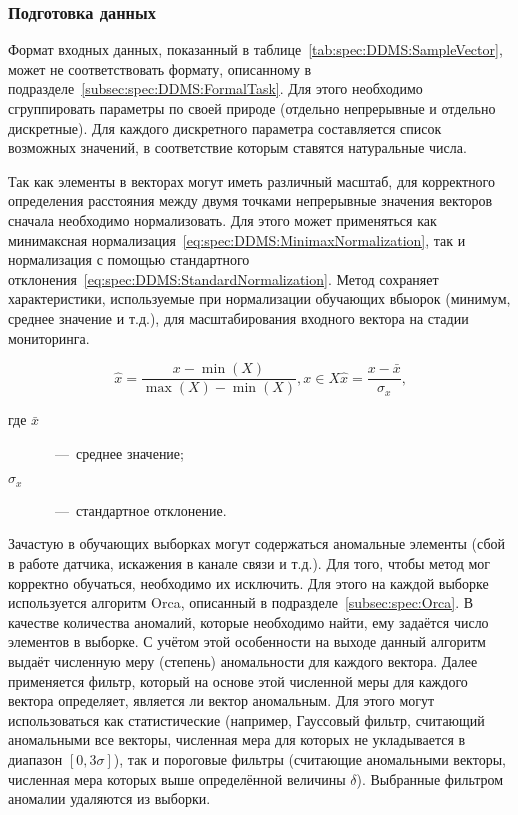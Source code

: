 \subsubsection{Подготовка данных}
\label{subsubsec:spec:DDMS:Preparing}
Формат входных данных, показанный в таблице~\ref{tab:spec:DDMS:SampleVector}, может не соответствовать формату, описанному в подразделе~\ref{subsec:spec:DDMS:FormalTask}. Для этого необходимо сгруппировать параметры по своей природе (отдельно непрерывные и отдельно дискретные). Для каждого дискретного параметра составляется список возможных значений, в соответствие которым ставятся натуральные числа.

Так как элементы в векторах могут иметь различный масштаб, для корректного определения расстояния между двумя точками непрерывные значения векторов сначала необходимо нормализовать. Для этого может применяться как минимаксная нормализация~\eqref{eq:spec:DDMS:MinimaxNormalization}, так и нормализация с помощью стандартного отклонения~\eqref{eq:spec:DDMS:StandardNormalization}. Метод сохраняет характеристики, используемые при нормализации обучающих вбыорок (минимум, среднее значение и т.д.), для масштабирования входного вектора на стадии мониторинга.

\begin{subequations}
\begin{equation} \label{eq:spec:DDMS:MinimaxNormalization}
\hat{x} = \frac{x - \min(X)}{\max(X) - \min(X)}, x\in X
\end{equation}
\begin{equation} \label{eq:spec:DDMS:StandardNormalization}
\hat{x} = \frac{x - \bar{x}}{\sigma_x} \text{,}
\end{equation}
\end{subequations}
\begin{description}
	\item[где $\bar{x}$]~---~среднее значение;
	\item[$\sigma_x$]~---~стандартное отклонение.
\end{description}

Зачастую в обучающих выборках могут содержаться аномальные элементы (сбой в работе датчика, искажения в канале связи и т.д.). Для того, чтобы метод мог корректно обучаться, необходимо их исключить. Для этого на каждой выборке используется алгоритм Orca, описанный в подразделе~\ref{subsec:spec:Orca}. В качестве количества аномалий, которые необходимо найти, ему задаётся число элементов в выборке. С учётом этой особенности на выходе данный алгоритм выдаёт численную меру (степень) аномальности для каждого вектора. Далее применяется фильтр, который на основе этой численной меры для каждого вектора определяет, является ли вектор аномальным. Для этого могут использоваться как статистические (например, Гауссовый фильтр, считающий аномальными все векторы, численная мера для которых не укладывается в диапазон $[0, 3\sigma]$), так и пороговые фильтры (считающие аномальными векторы, численная мера которых выше определённой величины $\delta$). Выбранные фильтром аномалии удаляются из выборки.

